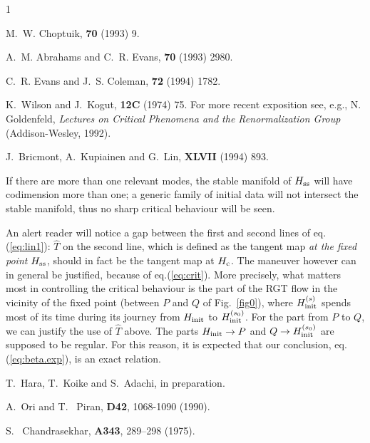\begin{thebibliography}{1}

M.~W. Choptuik,
 {\bf 70} (1993) 9.

A.~M. Abrahams and C.~R. Evans,
 {\bf 70} (1993) 2980.

C.~R. Evans and J.~S. Coleman,
 {\bf 72} (1994) 1782.


K.~Wilson and J.~Kogut,
 {\bf 12C} (1974) 75.
For more recent exposition see, e.g.,  N. Goldenfeld,
{\em Lectures on Critical Phenomena and the Renormalization Group}
(Addison-Wesley, 1992).

J.~Bricmont, A.~Kupiainen and G.~Lin,
 {\bf XLVII} (1994) 893.

If there are more than one relevant modes, the stable manifold of
$H_{\rm ss}$ will have codimension more than one; a generic
family of initial data will not intersect the stable manifold, thus
no sharp critical behaviour will be seen.

An alert reader will notice a gap between the
first and second lines of eq.(\ref{eq:lin1}): $\hat T$ on the
second line, which is defined as the tangent map
{\em at the fixed point $H_{\rm ss}$}, should in fact be
the tangent map at $H_{\rm c}$.
The maneuver however can in general be justified,
because of eq.(\ref{eq:crit}).
More precisely, what matters most in controlling the critical
behaviour is the part of the RGT flow in the vicinity of the fixed
point (between $P$ and $Q$ of Fig.~\ref{fig0}), where $H_{\rm init}^{(s)}$
spends most of its time during its journey from
$H_{\rm init}$ to $H_{\rm init}^{(s_0)}$.
For the part from $P$ to $Q$, we can justify the use of $\hat T$
above.  The parts $H_{\rm init} \rightarrow P$ and
$Q \rightarrow H_{\rm init}^{(s_0)}$
are supposed to be regular.
For this reason, it is expected that our conclusion,
eq. (\ref{eq:beta.exp}), is an exact relation.


T.~Hara, T.~Koike and S.~Adachi,
\newblock in preparation.

A.~Ori and T. ~Piran,
 {\bf D42}, 1068-1090 (1990).

S. ~Chandrasekhar,
 {\bf A343}, 289--298 (1975).



\end{thebibliography}


